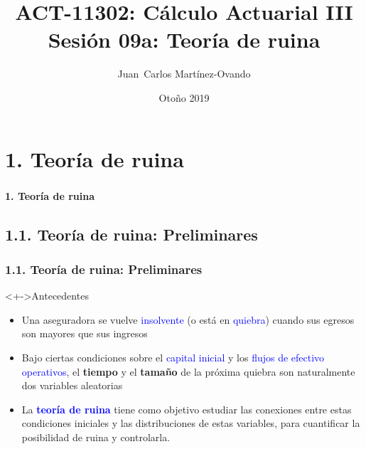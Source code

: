\documentclass[cjk,t,compress]{beamer}
\title[C\'alculo Actuarial III]
{	ACT-11302: C\'alculo Actuarial III\\
	{\large Sesi\'on 09a: Teor\'ia de ruina}
}
\author[Mart\'inez-Ovando]{
{	\footnotesize
	\textcolor{MyDarkGreen}{Juan~Carlos Mart\'inez-Ovando}}
}
\institute[ITAM]
{	\textcolor{MyDarkGrey}{
	ITAM}
}
\date[ ] %
{	\scriptsize
	\textcolor{MyDarkGrey}{Oto\~no 2019}
}
\begin{document}
\sffamily
\begin{frame}[fragile]
	\frametitle{}
	\titlepage
\end{frame}


%
%
\section{1. Teor\'ia de ruina}
\begin{frame}[fragile]
	\frametitle{}
	\vspace{5.5cm}
	\begin{flushright}
		\textcolor{MyDarkBlue}{\Large \bf 1. Teor\'ia de ruina}
	\end{flushright}
\end{frame}

%
%
\subsection{1.1. Teor\'ia de ruina: Preliminares}
\begin{frame}[fragile]
	\frametitle{1.1. Teor\'ia de ruina: Preliminares}
	\scriptsize  	
		
		\vspace{0.1cm}
		\begin{block}<+->{Antecedentes}
		\vspace{0.1cm}
		\begin{itemize}
		  \item Una aseguradora se vuelve \textcolor{blue}{insolvente} (o est\'a en \textcolor{blue}{quiebra}) cuando sus egresos son mayores que sus ingresos
		  
		  \item Bajo ciertas condiciones sobre el \textcolor{blue}{capital inicial} y los \textcolor{blue}{flujos de efectivo operativos}, el {\bf tiempo} y el {\bf tama\~no} de la pr\'oxima quiebra son naturalmente dos variables aleatorias
		  
		  \item La \textcolor{blue}{\bf teor\'ia de ruina} tiene como objetivo estudiar las conexiones entre estas condiciones iniciales y las distribuciones de estas variables, para cuantificar la posibilidad de ruina y controlarla.
		\end{itemize}
		\end{block}

\end{frame}
\end{document}
